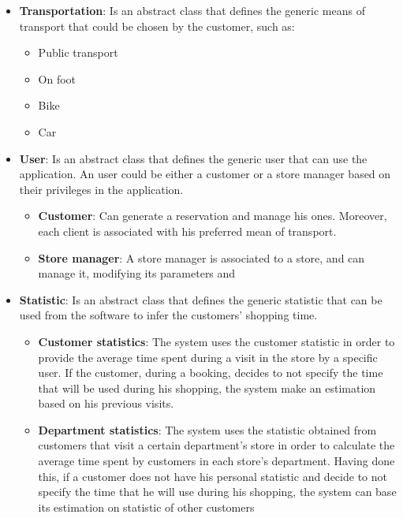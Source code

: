 \documentclass{article}
\begin{document}
			\begin{itemize}
				\item {\bfseries Transportation}: Is an abstract class that defines the generic means of transport that could be chosen by the customer, such as:
				
					\begin{itemize}
						\item Public transport
						\item On foot
						\item Bike
						\item Car
					\end{itemize}
				
				\item {\bfseries User}: Is an abstract class that defines the generic user that can use the application. An user could be either a customer or a store manager based on their privileges in the application.
				
					\begin{itemize}
						\item {\bfseries Customer}: Can generate a reservation and manage his ones. Moreover, each client is associated with his preferred mean of transport.						
						\item {\bfseries Store manager}: A store manager is associated to a store, and can manage it, modifying its parameters and 
					\end{itemize}
				
				\item {\bfseries Statistic}: Is an abstract class that defines the generic statistic that can be used from the software to infer the customers' shopping time.			
				\begin{itemize}
					\item {\bfseries Customer statistics}: The system uses the customer statistic in order to provide the average time spent during a visit in the store by a specific user. If the customer, during a booking, decides to not specify the time that will be used during his shopping, the system make an estimation based on his previous visits.
					
					\item {\bfseries Department statistics}: The system uses the statistic obtained from customers that visit a certain department's store in order to calculate the average time spent by customers in each store's department. Having done this, if a customer does not have his personal statistic and decide to not specify the time that he will use during his shopping, the system can base its estimation on statistic of other customers 
				

\end{itemize}
\end{itemize}
\end{document}
